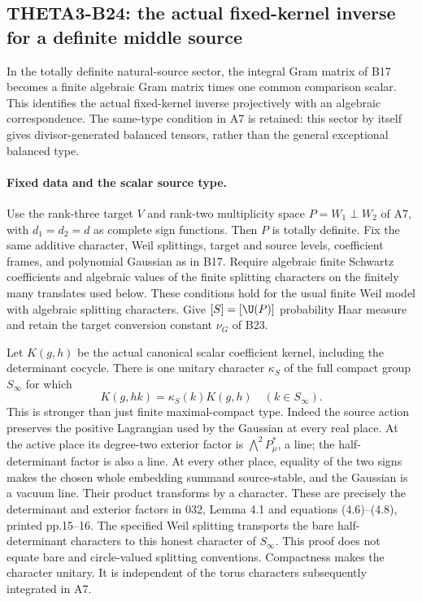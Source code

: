 \subsection{THETA3-B24: the actual fixed-kernel inverse for a definite middle source}\label{B24}

In the totally definite natural-source sector, the integral
Gram matrix of B17 becomes a finite algebraic Gram matrix
times one common comparison scalar.  This identifies the
actual fixed-kernel inverse projectively with an algebraic
correspondence.  The same-type condition in A7 is retained:
this sector by itself gives divisor-generated balanced
tensors, rather than the general exceptional balanced type.

\paragraph{Fixed data and the scalar source type.}
Use the rank-three target $V$ and rank-two multiplicity
space $P=W_1\perp W_2$ of A7, with $d_1=d_2=d$ as
complete sign functions.  Then $P$ is totally definite.
Fix the same additive character, Weil splittings, target
and source levels, coefficient frames, and polynomial
Gaussian as in B17.  Require algebraic finite Schwartz
coefficients and algebraic values of the finite splitting
characters on the finitely many translates used below.
These conditions hold for the usual finite Weil model
with algebraic splitting characters.  Give
$[S]=[\U(P)]$ probability Haar measure and retain the
target conversion constant $\nu_G$ of B23.

Let $K(g,h)$ be the actual canonical scalar coefficient
kernel, including the determinant cocycle.  There is one
unitary character $\kappa_S$ of the full compact group
$S_\infty$ for which
\[
                 K(g,hk)=\kappa_S(k)K(g,h)
                    \quad(k\in S_\infty).
 \tag{B24a}
\]
This is stronger than just finite maximal-compact type.
Indeed the source action preserves the positive
Lagrangian used by the Gaussian at every real place.
At the active place its degree-two exterior factor is
$\bigwedge^2P_\mu^*$, a line; the half-determinant
factor is also a line.  At every other place, equality
of the two signs makes the chosen whole embedding
summand source-stable, and the Gaussian is a vacuum
line.  Their product transforms by a character.
These are precisely the determinant and exterior
factors in 032, Lemma 4.1 and equations (4.6)--(4.8),
printed pp.15--16.
The specified Weil splitting transports the bare
half-determinant characters to this honest character
of $S_\infty$.  This proof does not equate bare and
circle-valued splitting conventions.  Compactness
makes the character unitary.  It is independent of
the torus characters subsequently integrated in A7.

